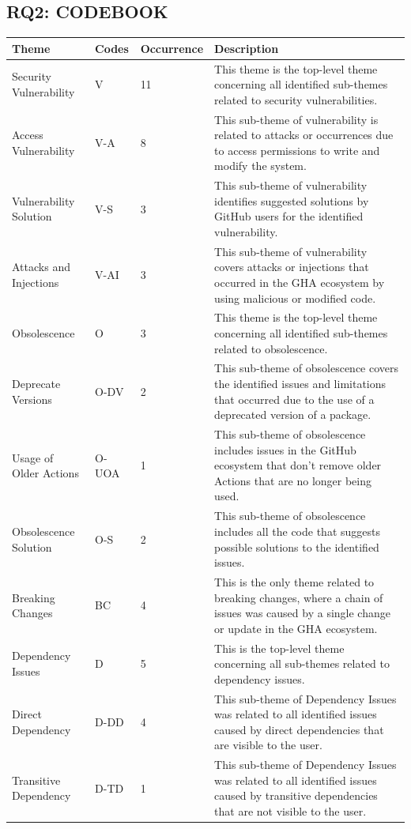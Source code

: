 \documentclass[conference]{IEEEtran}
\begin{document}
\subsection{RQ2: CODEBOOK}
\begin{table}[htb]
    \centering
    \label{tab:full-width}
    \hspace{0.5cm}
    \begin{tabular}{|p{3cm}|p{1cm}|p{1.5cm}|p{11cm}|}
        \hline
        \textbf{Theme} & \textbf{Codes}  & \textbf{Occurrence}  & \textbf{Description} \\
        \hline
        Security Vulnerability & V & 11 & This theme is the top-level theme concerning all identified sub-themes related to security vulnerabilities. \\
        \hline
        Access Vulnerability & V-A & 8 & This sub-theme of vulnerability is related to attacks or occurrences due to access permissions to write and modify the system. \\
        \hline
        Vulnerability Solution & V-S & 3 & This sub-theme of vulnerability identifies suggested solutions by GitHub users for the identified vulnerability.\\
        \hline
        Attacks and Injections & V-AI & 3 & This sub-theme of vulnerability covers attacks or injections that occurred in the GHA ecosystem by using malicious or modified code. \\
        \hline
        Obsolescence & O & 3 & This theme is the top-level theme concerning all identified sub-themes related to obsolescence.\\
        \hline
        Deprecate Versions & O-DV & 2 & This sub-theme of obsolescence covers the identified issues and limitations that occurred due to the use of a deprecated version of a package. \\
        \hline
        Usage of Older Actions & O-UOA & 1& This sub-theme of obsolescence includes issues in the GitHub ecosystem that don't remove older Actions that are no longer being used. \\
        \hline
        Obsolescence Solution & O-S & 2 & This sub-theme of obsolescence includes all the code that suggests possible solutions to the identified issues. \\
        \hline
        Breaking Changes & BC & 4 & This is the only theme related to breaking changes, where a chain of issues was caused by a single change or update in the GHA ecosystem. \\
        \hline
        Dependency Issues & D & 5 & This is the top-level theme concerning all sub-themes related to dependency issues. \\	
        \hline
        Direct Dependency  & D-DD & 4 & This sub-theme of Dependency Issues was related to all identified issues caused by direct dependencies that are visible to the user. \\	
        \hline
        Transitive Dependency & D-TD & 1 & This sub-theme of Dependency Issues was related to all identified issues caused by transitive dependencies that are not visible to the user.\\	
        \hline
    \end{tabular}
\end{table}	
\end{document}
